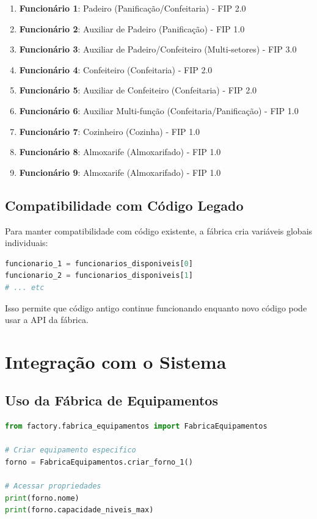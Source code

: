 \documentclass[11pt,a4paper]{article}
\begin{document}
\begin{enumerate}
    \item \textbf{Funcionário 1}: Padeiro (Panificação/Confeitaria) - FIP 2.0
    \item \textbf{Funcionário 2}: Auxiliar de Padeiro (Panificação) - FIP 1.0
    \item \textbf{Funcionário 3}: Auxiliar de Padeiro/Confeiteiro (Multi-setores) - FIP 3.0
    \item \textbf{Funcionário 4}: Confeiteiro (Confeitaria) - FIP 2.0
    \item \textbf{Funcionário 5}: Auxiliar de Confeiteiro (Confeitaria) - FIP 2.0
    \item \textbf{Funcionário 6}: Auxiliar Multi-função (Confeitaria/Panificação) - FIP 1.0
    \item \textbf{Funcionário 7}: Cozinheiro (Cozinha) - FIP 1.0
    \item \textbf{Funcionário 8}: Almoxarife (Almoxarifado) - FIP 1.0
    \item \textbf{Funcionário 9}: Almoxarife (Almoxarifado) - FIP 1.0
\end{enumerate}

\subsection{Compatibilidade com Código Legado}

Para manter compatibilidade com código existente, a fábrica cria variáveis globais individuais:

\begin{lstlisting}[language=Python]
funcionario_1 = funcionarios_disponiveis[0]
funcionario_2 = funcionarios_disponiveis[1]
# ... etc
\end{lstlisting}

Isso permite que código antigo continue funcionando enquanto novo código pode usar a API da fábrica.

\newpage

\section{Integração com o Sistema}

\subsection{Uso da Fábrica de Equipamentos}

\begin{lstlisting}[language=Python]
from factory.fabrica_equipamentos import FabricaEquipamentos

# Criar equipamento especifico
forno = FabricaEquipamentos.criar_forno_1()

# Acessar propriedades
print(forno.nome)
print(forno.capacidade_niveis_max)
\end{lstlisting}
\end{document}
